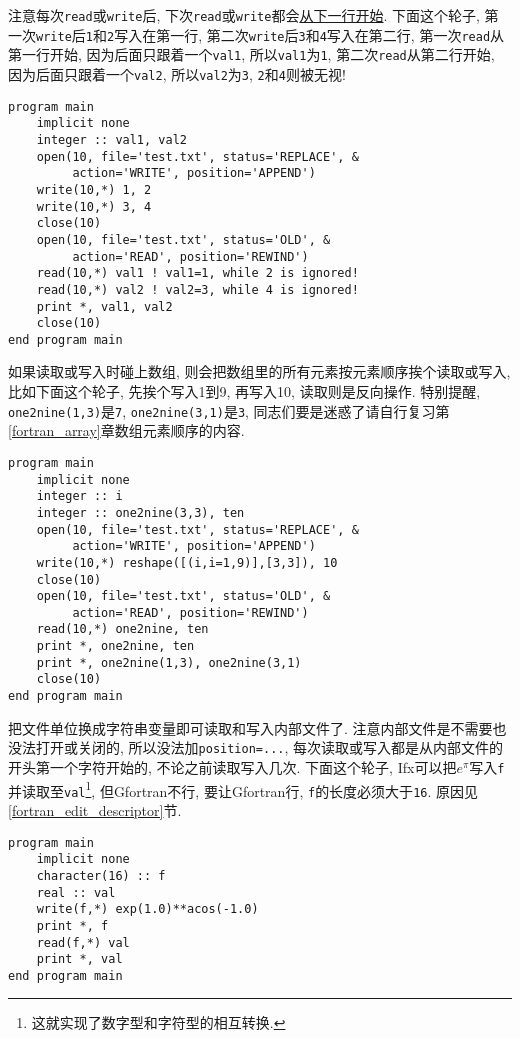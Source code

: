 注意每次\texttt{read}或\texttt{write}后, 下次\texttt{read}或\texttt{write}都会\uline{从下一行开始}. 下面这个轮子, 第一次\texttt{write}后\texttt{1}和\texttt{2}写入在第一行, 第二次\texttt{write}后\texttt{3}和\texttt{4}写入在第二行, 第一次\texttt{read}从第一行开始, 因为后面只跟着一个\texttt{val1}, 所以\texttt{val1}为\texttt{1}, 第二次\texttt{read}从第二行开始, 因为后面只跟着一个\texttt{val2}, 所以\texttt{val2}为\texttt{3}, \texttt{2}和\texttt{4}则被无视!
\begin{lstlisting}
program main
    implicit none
    integer :: val1, val2
    open(10, file='test.txt', status='REPLACE', &
         action='WRITE', position='APPEND')
    write(10,*) 1, 2
    write(10,*) 3, 4
    close(10)
    open(10, file='test.txt', status='OLD', &
         action='READ', position='REWIND')
    read(10,*) val1 ! val1=1, while 2 is ignored!
    read(10,*) val2 ! val2=3, while 4 is ignored!
    print *, val1, val2
    close(10)
end program main
\end{lstlisting}

如果读取或写入时碰上数组, 则会把数组里的所有元素按元素顺序挨个读取或写入, 比如下面这个轮子, 先挨个写入1到9, 再写入10, 读取则是反向操作. 特别提醒, \texttt{one2nine(1,3)}是\texttt{7}, \texttt{one2nine(3,1)}是\texttt{3}, 同志们要是迷惑了请自行复习第\ref{fortran_array}章数组元素顺序的内容.
\begin{lstlisting}
program main
    implicit none
    integer :: i
    integer :: one2nine(3,3), ten
    open(10, file='test.txt', status='REPLACE', &
         action='WRITE', position='APPEND')
    write(10,*) reshape([(i,i=1,9)],[3,3]), 10
    close(10)
    open(10, file='test.txt', status='OLD', &
         action='READ', position='REWIND')
    read(10,*) one2nine, ten
    print *, one2nine, ten
    print *, one2nine(1,3), one2nine(3,1)
    close(10)
end program main
\end{lstlisting}

把文件单位换成字符串变量即可读取和写入内部文件了. 注意内部文件是不需要也没法打开或关闭的, 所以没法加\texttt{position=...}, 每次读取或写入都是从内部文件的开头第一个字符开始的, 不论之前读取写入几次. 下面这个轮子, Ifx可以把$e^\pi$写入\texttt{f}并读取至\texttt{val}\footnote{这就实现了数字型和字符型的相互转换.}, 但Gfortran不行, 要让Gfortran行, \texttt{f}的长度必须大于\texttt{16}. 原因见\ref{fortran_edit_descriptor}节.\label{internal_file}
\begin{lstlisting}
program main
    implicit none
    character(16) :: f
    real :: val
    write(f,*) exp(1.0)**acos(-1.0)
    print *, f
    read(f,*) val
    print *, val
end program main
\end{lstlisting}

